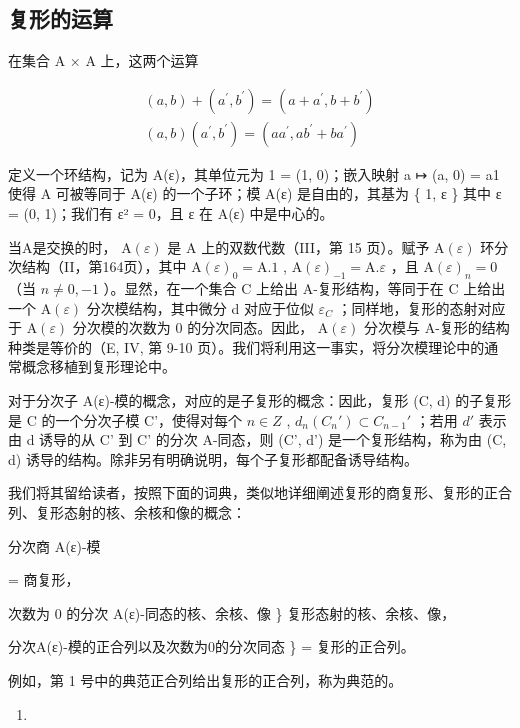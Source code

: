 \subsection{复形的运算}

在集合 A × A 上，这两个运算

\[
\begin{array}{l} (a, b) + (a ^ {\prime}, b ^ {\prime}) = (a + a ^ {\prime}, b + b ^ {\prime}) \\ (a, b) (a ^ {\prime}, b ^ {\prime}) = (a a ^ {\prime}, a b ^ {\prime} + b a ^ {\prime}) \end{array}
\]

定义一个环结构，记为 A(ε)，其单位元为 1 = (1, 0)；嵌入映射 a ↦ (a, 0) = a1 使得 A 可被等同于 A(ε) 的一个子环；模 A(ε) 是自由的，其基为 \{ 1, ε \} 其中 ε = (0, 1)；我们有 ε² = 0，且 ε 在 A(ε) 中是中心的。

当A是交换的时， \(\mathrm{A}(\varepsilon)\) 是 A 上的双数代数（III，第 15 页）。赋予 \(\mathrm{A}(\varepsilon)\) 环分次结构（II，第164页），其中 \(\mathrm{A}(\varepsilon)_{0} = \mathrm{A}.1\) , \(\mathrm{A}(\varepsilon)_{-1} = \mathrm{A}. \varepsilon\) ，且 \(\mathrm{A}(\varepsilon)_{n} = 0\) （当 \(n \neq 0, -1\) ）。显然，在一个集合 C 上给出 A-复形结构，等同于在 C 上给出一个 \(\mathrm{A}(\varepsilon)\) 分次模结构，其中微分 d 对应于位似 \(\varepsilon_{C}\) ；同样地，复形的态射对应于 \(\mathrm{A}(\varepsilon)\) 分次模的次数为 0 的分次同态。因此， \(\mathrm{A}(\varepsilon)\) 分次模与 A-复形的结构种类是等价的（E, IV, 第 9-10 页）。我们将利用这一事实，将分次模理论中的通常概念移植到复形理论中。

对于分次子 A(ε)-模的概念，对应的是子复形的概念：因此，复形 (C, d) 的子复形是 C 的一个分次子模 C'，使得对每个 \(n \in Z\) , \(d_{n}(C_{n}') \subset C_{n-1}'\) ；若用 \(d'\) 表示由 d 诱导的从 C' 到 C' 的分次 A-同态，则 (C', d') 是一个复形结构，称为由 (C, d) 诱导的结构。除非另有明确说明，每个子复形都配备诱导结构。

我们将其留给读者，按照下面的词典，类似地详细阐述复形的商复形、复形的正合列、复形态射的核、余核和像的概念：

分次商 A(ε)-模

= 商复形，

次数为 0 的分次 A(ε)-同态的核、余核、像 \} 复形态射的核、余核、像，

分次A(ε)-模的正合列以及次数为0的分次同态 \} = 复形的正合列。

例如，第 1 号中的典范正合列给出复形的正合列，称为典范的。

\begin{enumerate}
\def\labelenumi{(\Roman{enumi})}
\tightlist
\item
\end{enumerate}


